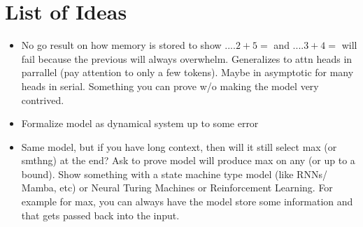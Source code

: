 \section{List of Ideas}

\begin{itemize}
    \item No go result on how memory is stored to show $.... 2 + 5 =$ and $.... 3 + 4 =$ will fail because the previous will always overwhelm. Generalizes to attn heads in parrallel (pay attention to only a few tokens). Maybe in asymptotic for many heads in serial. Something you can prove w/o making the model very contrived.
    \item Formalize model as dynamical system up to some error
    \item Same model, but if you have long context, then will it still select max (or smthng) at the end? Ask to prove model will produce max on any (or up to a bound). Show something with a state machine type model (like RNNs/ Mamba, etc) or Neural Turing Machines or Reinforcement Learning. For example for max, you can always have the model store some information and that gets passed back into the input.
\end{itemize}